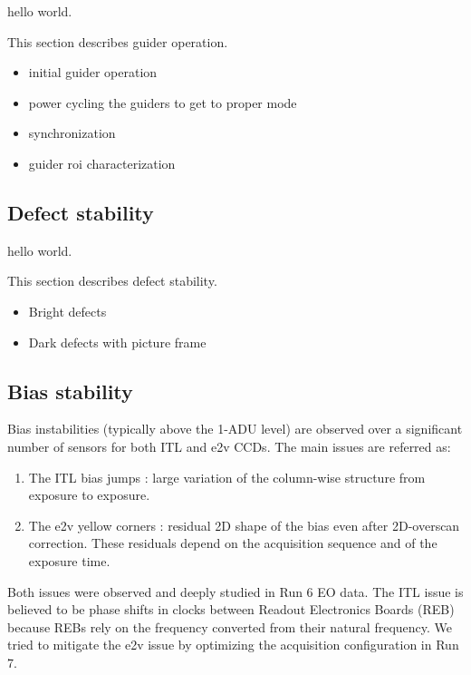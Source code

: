 hello world.

This section describes guider operation.

\begin{itemize}
\tightlist
\item
  initial guider operation
\item
  power cycling the guiders to get to proper mode
\item
  synchronization
\item
  guider roi characterization
\end{itemize}

\subsection{Defect stability}\label{defect-stability}

hello world.

This section describes defect stability.

\begin{itemize}
\tightlist
\item
  Bright defects
\item
  Dark defects with picture frame
\end{itemize}

\subsection{Bias stability}\label{bias-stability-2}

Bias instabilities (typically above the 1-ADU level) are observed over a
significant number of sensors for both ITL and e2v CCDs. The main issues
are referred as:

\begin{enumerate}
\tightlist
\item
  The ITL bias jumps : large variation of the column-wise structure from
  exposure to exposure.
\item
  The e2v yellow corners : residual 2D shape of the bias even after
  2D-overscan correction. These residuals depend on the acquisition
  sequence and of the exposure time.
\end{enumerate}

Both issues were observed and deeply studied in Run 6 EO data. The ITL
issue is believed to be phase shifts in clocks between Readout
Electronics Boards (REB) because REBs rely on the frequency converted
from their natural frequency. We tried to mitigate the e2v issue by
optimizing the acquisition configuration in Run 7.

